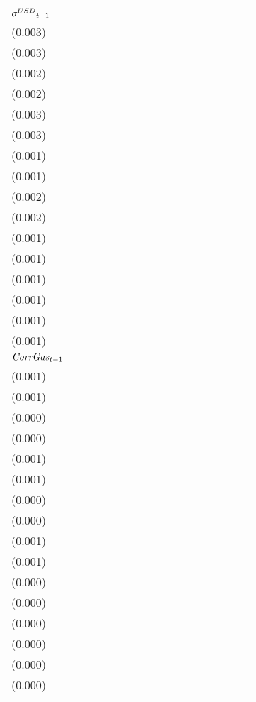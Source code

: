 \begin{tabular}{lllllllllllllllll}
${{\it \sigma}^{USD}}_{t-1}$ &   \makecell{$0.059^{**}$ \\(0.003)} &   \makecell{$0.066^{**}$ \\(0.003)} &   \makecell{$0.006^{**}$ \\(0.002)} &   \makecell{$0.006^{**}$ \\(0.002)} &     \makecell{$0.001^{}$ \\(0.003)} &    \makecell{$-0.005^{}$ \\(0.003)} &    \makecell{$-0.000^{}$ \\(0.001)} &    \makecell{$-0.000^{}$ \\(0.001)} &    \makecell{$-0.001^{}$ \\(0.002)} &    \makecell{$-0.004^{}$ \\(0.002)} &    \makecell{$-0.000^{}$ \\(0.001)} &    \makecell{$-0.000^{}$ \\(0.001)} &   \makecell{$0.016^{**}$ \\(0.001)} &  \makecell{$0.019^{**}$ \\(0.001)} &    \makecell{$0.000^{}$ \\(0.001)} &    \makecell{$0.001^{}$ \\(0.001)} \\
${{\it CorrGas}}_{t-1}$      &     \makecell{$0.001^{}$ \\(0.001)} &     \makecell{$0.001^{}$ \\(0.001)} &     \makecell{$0.000^{}$ \\(0.000)} &     \makecell{$0.000^{}$ \\(0.000)} &   \makecell{$0.003^{**}$ \\(0.001)} &    \makecell{$0.002^{*}$ \\(0.001)} &    \makecell{$-0.000^{}$ \\(0.000)} &    \makecell{$-0.000^{}$ \\(0.000)} &   \makecell{$0.002^{**}$ \\(0.001)} &    \makecell{$0.001^{*}$ \\(0.001)} &    \makecell{$-0.000^{}$ \\(0.000)} &    \makecell{$-0.000^{}$ \\(0.000)} &    \makecell{$-0.001^{}$ \\(0.000)} &   \makecell{$-0.000^{}$ \\(0.000)} &   \makecell{$-0.000^{}$ \\(0.000)} &   \makecell{$-0.000^{}$ \\(0.000)} \\

\end{tabular}
